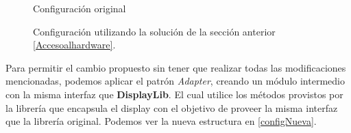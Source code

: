\begin{figure}[!h]
\caption{Configuración original}
\begin{center}
\end{center}
\end{figure}

\begin{figure}[!h]
\caption{Configuración utilizando la solución de la sección anterior \ref{Accesoalhardware}.}
\begin{center}
\end{center}
\end{figure}


Para permitir el cambio propuesto sin tener que realizar todas las modificaciones mencionadas, podemos aplicar el patrón \textit{Adapter}, creando un módulo intermedio con la misma interfaz que \textbf{DisplayLib}. El cual utilice los métodos provistos por la librería que encapsula el display con el objetivo de proveer la misma interfaz que la librería original. Podemos ver la nueva estructura en \ref{configNueva}.

